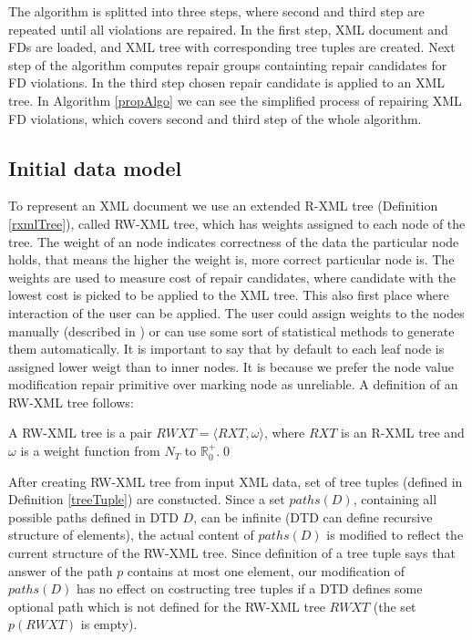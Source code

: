 The algorithm is splitted into three steps, where second and third step are repeated until all violations are repaired. In the first step, XML document and FDs are loaded, and XML tree with corresponding tree tuples are created. Next step of the algorithm computes repair groups containting repair candidates for FD violations. In the third step chosen repair candidate is applied to an XML tree. In Algorithm \ref{propAlgo} we can see the simplified process of repairing XML FD violations, which covers second and third step of the whole algorithm.

\subsection{Initial data model}

To represent an XML document we use an extended R-XML tree (Definition \ref{rxmlTree}), called RW-XML tree, which has weights assigned to each node of the tree. The weight of an node indicates correctness of the data the particular node holds, that means the higher the weight is, more correct particular node is. The weights are used to measure cost of repair candidates, where candidate with the lowest cost is picked to be applied to the XML tree. This also first place where interaction of the user can be applied. The user could assign weights to the nodes manually (described in ) or can use some sort of statistical methods to generate them automatically. It is important to say that by default to each leaf node is assigned lower weigt than to inner nodes. It is because we prefer the node value modification repair primitive over marking node as unreliable. A definition of an RW-XML tree follows:

\begin{define}
A RW-XML tree is a pair $RWXT = \langle RXT, \omega \rangle$, where $RXT$ is an R-XML tree and $\omega$ is a weight function from $N_T$ to $\mathbb{R}^+_0$.\qed
\end{define}

After creating RW-XML tree from input XML data, set of tree tuples (defined in Definition \ref{treeTuple}) are constucted. Since a set $paths(D)$, containing all possible paths defined in DTD $D$, can be infinite (DTD can define recursive structure of elements), the actual content of $paths(D)$ is modified to reflect the current structure of the RW-XML tree. Since definition of a tree tuple says that answer of the path $p$ contains at most one element, our modification of $paths(D)$ has no effect on costructing tree tuples if a DTD defines some optional path which is not defined for the RW-XML tree $RWXT$ (the set $p(RWXT)$ is empty).

